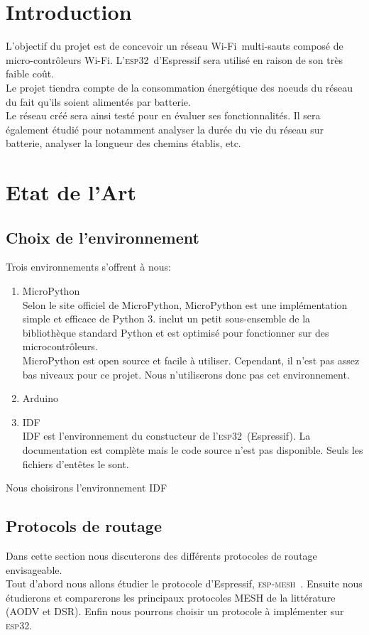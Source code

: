 \documentclass[a4paper, 12pt]{report}
\newcommand{\esp}{\textsc{esp32}}
\newcommand{\espmesh}{\textsc{esp-mesh}}
\newcommand{\wifi}{Wi-Fi}
\begin{document}
\chapter*{Introduction}
    L'objectif du projet est de concevoir un réseau \wifi\ multi-sauts composé 
    de micro-contrôleurs \wifi. L'\esp\ d'Espressif sera utilisé en raison de 
    son très faible coût.\\
    Le projet tiendra compte de la consommation énergétique des noeuds du 
    réseau du fait qu'ils soient alimentés par batterie.\\
    Le réseau créé sera ainsi testé pour en évaluer ses fonctionnalités. 
    Il sera également étudié pour notamment analyser la durée du vie du réseau 
    sur batterie, analyser la longueur des chemins établis, etc.

\tableofcontents
\newpage

\chapter{Etat de l'Art}
\section{Choix de l'environnement}
    Trois environnements s'offrent à nous:
    \begin{enumerate}
        \item MicroPython\\
            Selon le site officiel de MicroPython\cite{micropython_w}, MicroPython est une implémentation simple et efficace de Python 3.
            inclut un petit sous-ensemble de la bibliothèque standard Python et est optimisé pour fonctionner sur des microcontrôleurs.\\
            MicroPython est open source et facile à utiliser. Cependant, il n'est pas assez bas niveaux pour ce projet. Nous n'utiliserons donc pas cet environnement.
        \item Arduino
        \item IDF\\
            IDF est l'environnement du constucteur de l'\esp\ (Espressif). La documentation est complète mais le code source n'est pas disponible. Seuls
            les fichiers d'entêtes le sont.%
    \end{enumerate}

    Nous choisirons l'environnement IDF 
\section{Protocols de routage}
    Dans cette section nous discuterons des différents protocoles de routage envisageable.\\
    Tout d'abord nous allons étudier le protocole d'Espressif, \espmesh\ .
    Ensuite nous étudierons et comparerons les principaux protocoles MESH de la littérature (AODV et DSR).
    Enfin nous pourrons choisir un protocole à implémenter sur \esp.
\end{document}
